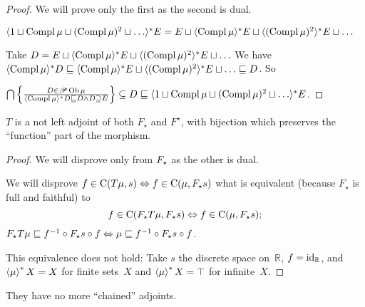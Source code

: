 \begin{proof}
  We will prove only the first as the second is dual.
  
  $\langle 1 \sqcup \operatorname{Compl} \mu \sqcup (\operatorname{Compl} \mu)^2 \sqcup \ldots
  \rangle^{\ast} E = E \sqcup \langle \operatorname{Compl} \mu \rangle^{\ast} E \sqcup
  \langle (\operatorname{Compl} \mu)^2 \rangle^{\ast} E \sqcup \ldots$
  
  Take $D = E \sqcup \langle \operatorname{Compl} \mu \rangle^{\ast} E \sqcup \langle
  (\operatorname{Compl} \mu)^2 \rangle^{\ast} E \sqcup \ldots$ We have $\langle
  \operatorname{Compl} \mu \rangle^{\ast} D \sqsubseteq \langle \operatorname{Compl} \mu
  \rangle^{\ast} E \sqcup \langle (\operatorname{Compl} \mu)^2 \rangle^{\ast} E \sqcup
  \ldots \sqsubseteq D$. So
  
  $\bigcap \left\{ \frac{ D \in \mathscr{P} \operatorname{Ob} \mu }{
  \langle \operatorname{Compl} \mu \rangle^{\ast} D \sqsubseteq D \wedge D \supseteq E
  }\right\} \subseteq D \sqsubseteq \langle 1 \sqcup \operatorname{Compl} \mu \sqcup
  (\operatorname{Compl} \mu)^2 \sqcup \ldots \rangle^{\ast} E$.
\end{proof}

\begin{example}
  $T$ is a not left adjoint of both $F_{\star}$ and $F^{\star}$, with bijection
  which preserves the ``function'' part of the morphism.
\end{example}

\begin{proof}
  We will disprove only from $F_{\star}$ as the other is dual.
  
  We will disprove $f \in \mathrm{C} (T \mu, s) \Leftrightarrow f \in \mathrm{C}
  (\mu, F_{\star} s)$ what is equivalent
  (because $F_{\star}$ is full and faithful) to
  \[ f \in \mathrm{C} (F_{\star} T \mu, F_{\star} s) \Leftrightarrow f \in
     \mathrm{C} (\mu, F_{\star} s) ; \]
  $F_{\star} T \mu \sqsubseteq f^{- 1} \circ F_{\star} s \circ f
  \Leftrightarrow \mu \sqsubseteq f^{- 1} \circ F_{\star} s \circ f$.
  
  This equivalence does not hold: Take $s$ the discrete space
  on~$\mathbb{R}$, $f=\operatorname{id}_{\mathbb{R}}$, and
  $\left\langle \mu\right\rangle ^{\ast}X=X$ for finite sets~$X$ and $\left\langle \mu\right\rangle ^{\ast}X=\top$
  for infinite~$X$.
\end{proof}

\begin{conjecture}
  They have no more ``chained'' adjoints.
\end{conjecture}
